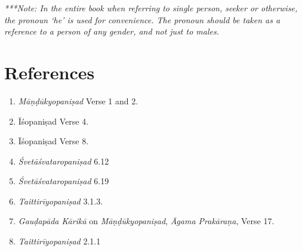 \emph{***Note: In the entire book when referring to single person, seeker or otherwise, the pronoun `he' is used for convenience. The pronoun should be taken as a reference to a person of any gender, and not just to males.}

\section*{References}

\begin{enumerate}
\item
	\emph{Māṇḍūkyopaniṣad} Verse 1 and 2.
\item
  Īśopaniṣad Verse 4.
\item
  Īśopaniṣad Verse 8.
\item
  \emph{Śvetāśvataropaniṣad} 6.12
\item
  \emph{Śvetāśvataropaniṣad} 6.19
\item
  \emph{Taittirīyopaniṣad} 3.1.3.
\item
  \emph{Gauḍapāda Kārikā} on \emph{Māṇḍūkyopaniṣad}, \emph{Āgama Prakāraṇa}, Verse 17.
\item
  \emph{Taittirīyopaniṣad} 2.1.1
\end{enumerate}

